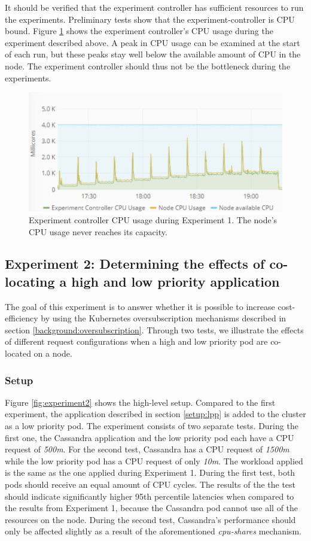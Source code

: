 It should be verified that the experiment controller has sufficient resources to run the experiments. Preliminary tests show that the experiment-controller is CPU bound. Figure \ref{fig:cpu-scalar} shows the experiment controller's CPU usage during the experiment described above. A peak in CPU usage can be examined at the start of each run, but these peaks stay well below the available amount of CPU in the node. The experiment controller should thus not be the bottleneck during the experiments. \\

\begin{figure}
\centering
\includegraphics[width=0.80\columnwidth]{Images/Experiments/CPU/Grafana/cpu-scalar.PNG}
\caption{Experiment controller CPU usage during Experiment 1. The node's CPU usage never reaches its capacity.}
\label{fig:cpu-scalar} 
\end{figure}

\subsection{Experiment 2: Determining the effects of co-locating a high and low priority application}
The goal of this experiment is to answer whether it is possible to increase cost-efficiency by using the Kubernetes oversubscription mechanisms described in section \ref{background:oversubscription}. Through two tests, we illustrate the effects of different request configurations when a high and low priority pod are co-located on a node.

\subsubsection{Setup}
Figure \ref{fig:experiment2} shows the high-level setup. Compared to the first experiment, the application described in section \ref{setup:lpp} is added to the cluster as a low priority pod. The experiment consists of two separate tests. During the first one, the Cassandra application and the low priority pod each have a CPU request of \textit{500m}. For the second test, Cassandra has a CPU request of \textit{1500m} while the low priority pod has a CPU request of only \textit{10m}. The workload applied is the same as the one applied during Experiment 1. During the first test, both pods should receive an equal amount of CPU cycles. The results of the the test should indicate significantly higher 95th percentile latencies when compared to the results from Experiment 1, because the Cassandra pod cannot use all of the resources on the node. During the second test, Cassandra's performance should only be affected slightly as a result of the aforementioned \textit{cpu-shares} mechanism.

